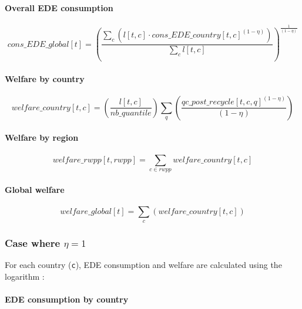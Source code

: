 \documentclass[
]{article}
\begin{document}
\paragraph{Overall EDE consumption}\label{overall-ede-consumption}

\begin{equation}
 cons\_EDE\_global[t] = \left( \frac{\sum_c (l[t,c] \cdot cons\_EDE\_country[t,c]^{(1-\eta)})}{\sum_c l[t,c]} \right)^{\frac{1}{(1-\eta)}} 
\end{equation}


\paragraph{Welfare by country}\label{welfare-by-country}

\begin{equation}
  welfare\_country[t,c] = \left( \frac{l[t,c]}{nb\_quantile} \right) \sum_q \left( \frac{qc\_post\_recycle[t,c,q]^{(1-\eta)}}{(1-\eta)} \right)
\end{equation}

\paragraph{Welfare by region}\label{welfare-by-region}

\begin{equation} 
  welfare\_rwpp[t,rwpp] = \sum_{c \in rwpp}welfare\_country[t,c]
\end{equation}

\paragraph{Global welfare}\label{global-welfare}

\begin{equation}
  welfare\_global[t] = \sum_c (welfare\_country[t,c])
\end{equation}

\subsubsection{\texorpdfstring{Case where
\(\eta = 1\)}{Case where \textbackslash eta = 1}}\label{case-where-eta-1}

For each country (\texttt{c}), EDE consumption and welfare are
calculated using the logarithm :

\paragraph{EDE consumption by
country}\label{ede-consumption-by-country-1}
\end{document}
